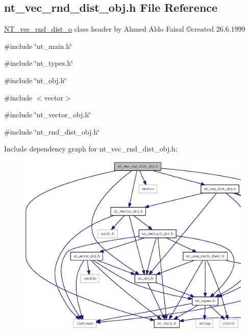 \subsection{nt\_\-vec\_\-rnd\_\-dist\_\-obj.h File Reference}
\label{nt__vec__rnd__dist__obj_8h}



\begin{DoxyItemize}
\item \hyperlink{class_n_t__vec__rnd__dist__o}{NT\_\-vec\_\-rnd\_\-dist\_\-o} class header by Ahmed Aldo Faisal \copyright created 26.6.1999 
\end{DoxyItemize} 


{\ttfamily \#include \char`\"{}nt\_\-main.h\char`\"{}}\par
{\ttfamily \#include \char`\"{}nt\_\-types.h\char`\"{}}\par
{\ttfamily \#include \char`\"{}nt\_\-obj.h\char`\"{}}\par
{\ttfamily \#include $<$vector$>$}\par
{\ttfamily \#include \char`\"{}nt\_\-vector\_\-obj.h\char`\"{}}\par
{\ttfamily \#include \char`\"{}nt\_\-rnd\_\-dist\_\-obj.h\char`\"{}}\par
Include dependency graph for nt\_\-vec\_\-rnd\_\-dist\_\-obj.h:
\nopagebreak
\begin{figure}[H]
\begin{center}
\leavevmode
\includegraphics[width=400pt]{nt__vec__rnd__dist__obj_8h__incl}
\end{center}
\end{figure}
